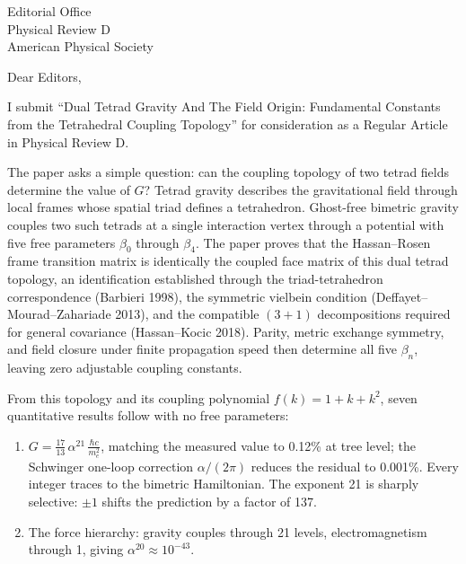 \documentclass[11pt]{letter}
\begin{document}
\begin{letter}{Editorial Office\\Physical Review D\\American Physical Society}

\opening{Dear Editors,}

I submit ``Dual Tetrad Gravity And The Field Origin: Fundamental Constants from the Tetrahedral Coupling Topology'' for consideration as a Regular Article in Physical Review D.


The paper asks a simple question: can the coupling topology of two tetrad fields determine the value of $G$? Tetrad gravity describes the gravitational field through local frames whose spatial triad defines a tetrahedron. Ghost-free bimetric gravity couples two such tetrads at a single interaction vertex through a potential with five free parameters $\beta_0$ through $\beta_4$. The paper proves that the Hassan--Rosen frame transition matrix is identically the coupled face matrix of this dual tetrad topology, an identification established through the triad-tetrahedron correspondence (Barbieri 1998), the symmetric vielbein condition (Deffayet--Mourad--Zahariade 2013), and the compatible $(3{+}1)$ decompositions required for general covariance (Hassan--Kocic 2018). Parity, metric exchange symmetry, and field closure under finite propagation speed then determine all five $\beta_n$, leaving zero adjustable coupling constants.


From this topology and its coupling polynomial $f(k) = 1 + k + k^2$, seven quantitative results follow with no free parameters:
%
\begin{enumerate}
\item $G = \frac{17}{13}\,\alpha^{21}\,\frac{\hbar c}{m_e^2}$, matching the measured value to 0.12\% at tree level; the Schwinger one-loop correction $\alpha/(2\pi)$ reduces the residual to 0.001\%. Every integer traces to the bimetric Hamiltonian. The exponent 21 is sharply selective: $\pm 1$ shifts the prediction by a factor of 137.

\item The force hierarchy: gravity couples through 21 levels, electromagnetism through 1, giving $\alpha^{20} \approx 10^{-43}$.


\end{enumerate}
\end{letter}
\end{document}
